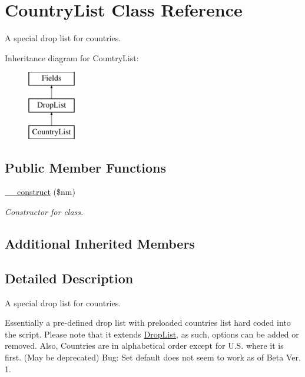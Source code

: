 \hypertarget{class_country_list}{\section{Country\-List Class Reference}
\label{class_country_list}
}


A special drop list for countries.  


Inheritance diagram for Country\-List\-:\begin{figure}[H]
\begin{center}
\leavevmode
\includegraphics[height=3.000000cm]{class_country_list}
\end{center}
\end{figure}
\subsection*{Public Member Functions}
\begin{DoxyCompactItemize}
\item 
\hyperlink{class_country_list_ac610fc08cbb0781b26136636de129bc0}{\-\_\-\-\_\-construct} (\$nm)
\begin{DoxyCompactList}\small\item\em Constructor for class. \end{DoxyCompactList}\end{DoxyCompactItemize}
\subsection*{Additional Inherited Members}


\subsection{Detailed Description}
A special drop list for countries. 

Essentially a pre-\/defined drop list with preloaded countries list hard coded into the script. Please note that it extends \hyperlink{class_drop_list}{Drop\-List}, as such, options can be added or removed. Also, Countries are in alphabetical order except for U.\-S. where it is first. (May be deprecated) Bug\-: Set default does not seem to work as of Beta Ver. 1. 


